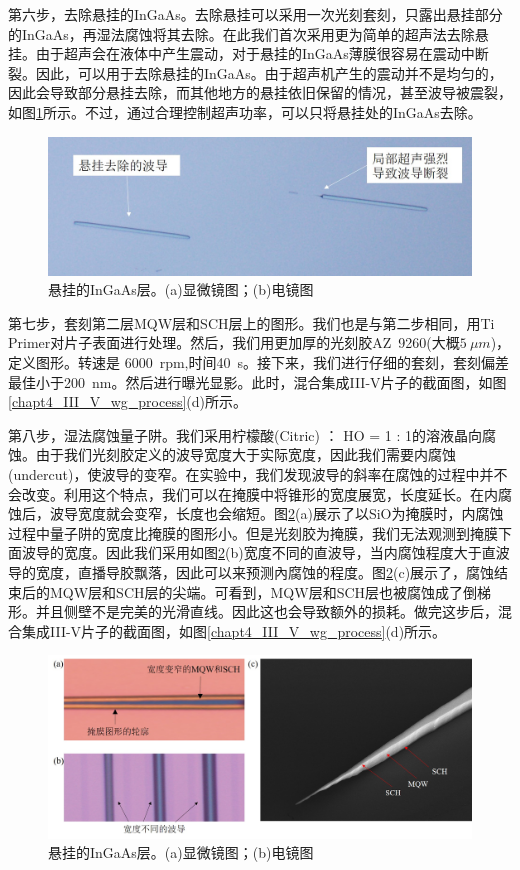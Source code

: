 第六步，去除悬挂的InGaAs。去除悬挂可以采用一次光刻套刻，只露出悬挂部分的InGaAs，再湿法腐蚀将其去除。在此我们首次采用更为简单的超声法去除悬挂。由于超声会在液体中产生震动，对于悬挂的InGaAs薄膜很容易在震动中断裂。因此，可以用于去除悬挂的InGaAs。由于超声机产生的震动并不是均匀的，因此会导致部分悬挂去除，而其他地方的悬挂依旧保留的情况，甚至波导被震裂，如图\ref{chapt4_III_V_remove_InGaAs}所示。不过，通过合理控制超声功率，可以只将悬挂处的InGaAs去除。
\begin{figure}[!h]
	\centering
	\includegraphics[width=14cm]{./Pictures/chapt4_III_V_remove_InGaAs.jpg}
	\caption{悬挂的InGaAs层。(a)显微镜图；(b)电镜图}
	\label{chapt4_III_V_remove_InGaAs}
\end{figure}

第七步，套刻第二层MQW层和SCH层上的图形。我们也是与第二步相同，用Ti Primer对片子表面进行处理。然后，我们用更加厚的光刻胶AZ~9260(大概$5~\mu m$)，定义图形。转速是 6000~rpm,时间40~s。接下来，我们进行仔细的套刻，套刻偏差最佳小于200~nm。然后进行曝光显影。此时，混合集成III-V片子的截面图，如图\ref{chapt4_III_V_wg_process}(d)所示。

第八步，湿法腐蚀量子阱。我们采用柠檬酸(Citric) ： HO = 1 : 1的溶液晶向腐蚀。由于我们光刻胶定义的波导宽度大于实际宽度，因此我们需要内腐蚀(undercut)，使波导的变窄。在实验中，我们发现波导的斜率在腐蚀的过程中并不会改变。利用这个特点，我们可以在掩膜中将锥形的宽度展宽，长度延长。在内腐蚀后，波导宽度就会变窄，长度也会缩短。图\ref{chapt4_III_V_undercut_MQW}(a)展示了以SiO为掩膜时，内腐蚀过程中量子阱的宽度比掩膜的图形小。但是光刻胶为掩膜，我们无法观测到掩膜下面波导的宽度。因此我们采用如图\ref{chapt4_III_V_undercut_MQW}(b)宽度不同的直波导，当内腐蚀程度大于直波导的宽度，直播导胶飘落，因此可以来预测內腐蚀的程度。图\ref{chapt4_III_V_undercut_MQW}(c)展示了，腐蚀结束后的MQW层和SCH层的尖端。可看到，MQW层和SCH层也被腐蚀成了倒梯形。并且侧壁不是完美的光滑直线。因此这也会导致额外的损耗。做完这步后，混合集成III-V片子的截面图，如图\ref{chapt4_III_V_wg_process}(d)所示。
\begin{figure}[!h]
	\centering
	\includegraphics[width=14cm]{./Pictures/chapt4_III_V_undercut_MQW.jpg}
	\caption{悬挂的InGaAs层。(a)显微镜图；(b)电镜图}
	\label{chapt4_III_V_undercut_MQW}
\end{figure}

